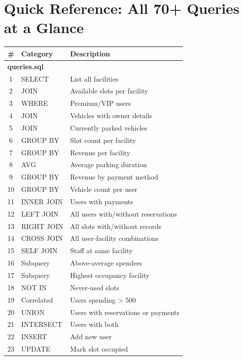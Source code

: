 \documentclass[12pt,a4paper]{article}
\begin{document}
\section*{Quick Reference: All 70+ Queries at a Glance}

\begin{longtable}{@{}clp{8cm}@{}}
\toprule
\textbf{\#} & \textbf{Category} & \textbf{Description} \\
\midrule
\multicolumn{3}{l}{\textbf{queries.sql}} \\
\midrule
1  & SELECT   & List all facilities \\
2  & JOIN     & Available slots per facility \\
3  & WHERE    & Premium/VIP users \\
4  & JOIN     & Vehicles with owner details \\
5  & JOIN     & Currently parked vehicles \\
6  & GROUP BY & Slot count per facility \\
7  & GROUP BY & Revenue per facility \\
8  & AVG      & Average parking duration \\
9  & GROUP BY & Revenue by payment method \\
10 & GROUP BY & Vehicle count per user \\
11 & INNER JOIN & Users with payments \\
12 & LEFT JOIN  & All users with/without reservations \\
13 & RIGHT JOIN & All slots with/without records \\
14 & CROSS JOIN & All user-facility combinations \\
15 & SELF JOIN  & Staff at same facility \\
16 & Subquery & Above-average spenders \\
17 & Subquery & Highest occupancy facility \\
18 & NOT IN   & Never-used slots \\
19 & Correlated & Users spending > 500 \\
20 & UNION    & Users with reservations or payments \\
21 & INTERSECT & Users with both \\
22 & INSERT   & Add new user \\
23 & UPDATE   & Mark slot occupied \\

\end{longtable}
\end{document}
